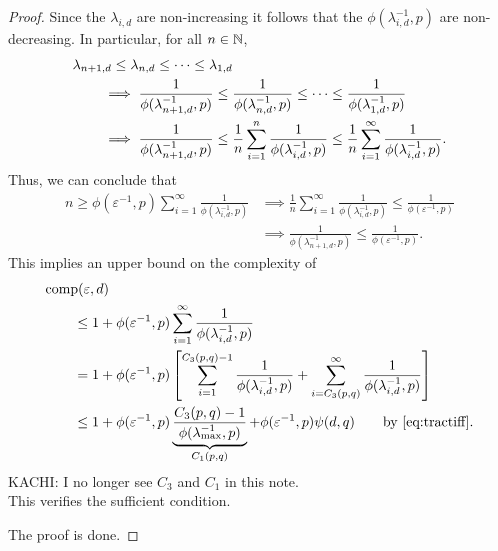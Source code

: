 \documentclass{article}
\theoremstyle{definition}
\newcommand{\kachi}[1]{\begingroup\color{ForestGreen}#1\endgroup}
\begin{document}
\begin{proof}
Since the $\lambda_{i,d}$ are non-increasing it follows that the $\phi(\lambda_{i, d}^{-1},p)$ are non-decreasing.  In particular, for all $n \in \mathbb{N}$,
\begin{align*}
    \MoveEqLeft{\lambda_{n+1,d} \le \lambda_{n,d} \le \cdots \le \lambda_{1,d}} \\
    & \implies \frac{1}{\phi(\lambda_{n+1, d}^{-1},p)} \le \frac{1}{\phi(\lambda_{n, d}^{-1},p)} \le \cdots \le \frac{1}{\phi(\lambda_{1, d}^{-1},p)} \\
    & \implies \frac{1}{\phi(\lambda_{n+1, d}^{-1},p)} 
    \le \frac 1n \sum_{i=1}^n  \frac{1}{\phi(\lambda_{i, d}^{-1},p)} 
    \le \frac 1n \sum_{i=1}^\infty  \frac{1}{\phi(\lambda_{i, d}^{-1},p)}.
\end{align*}
Thus, we can conclude that 
\begin{align*}
    n \ge \phi(\varepsilon^{-1},p) \sum_{i=1}^\infty \frac{1}{\phi(\lambda_{i, d}^{-1},p)}
    & \implies 
  \frac 1n \sum_{i=1}^\infty \frac{1}{\phi(\lambda_{i, d}^{-1},p)} \le  \frac{1}{\phi(\varepsilon^{-1},p)} \\
   & \implies   \frac{1}{\phi(\lambda_{n+1, d}^{-1},p)} \le \frac{1}{\phi(\varepsilon^{-1},p)}.
\end{align*}
This implies an upper bound on the complexity of
\begin{align*}
       \MoveEqLeft{\comp(\varepsilon,d)} \\
       &\le 1 + \phi(\varepsilon^{-1},p) \sum_{i=1}^\infty \frac{1}{\phi(\lambda_{i, d}^{-1},p)} \\
       & = 1 + \phi(\varepsilon^{-1},p) \left [ \sum_{i=1}^{C_3(p,q)-1} \frac{1}{\phi(\lambda_{i, d}^{-1},p)}  + \sum_{i=C_3(p,q)}^\infty \frac{1}{\phi(\lambda_{i, d}^{-1},p)} \right ] \\
       & \le 1+  \phi(\varepsilon^{-1},p) \underbrace{\frac{C_3(p,q)-1}{\phi(\lambda_{\max}^{-1},p)}}_{C_1(p,q)}
       +  \phi(\varepsilon^{-1},p) \psi(d,q) 
        \qquad \text{by \eqref{eq:tractiff}}. \\
\end{align*}
\kachi{KACHI: I no longer see $C_3$ and $C_1$ in this note.}\\
This verifies the sufficient condition.



The proof is done.
\end{proof}
\end{document}
